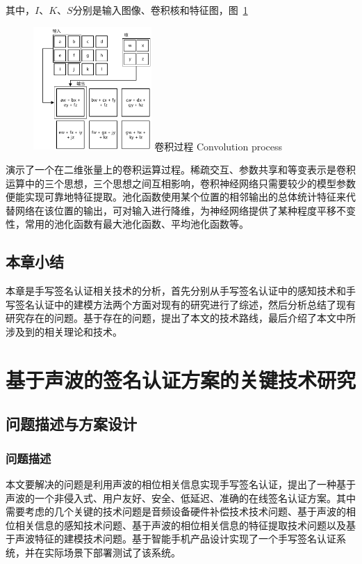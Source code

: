 其中，$I$、$K$、$S$分别是输入图像、卷积核和特征图，图~\ref{fig:convolution-process}
\begin{figure}[!htp]
  \centering
  \includegraphics[width=0.4\textwidth]{figure/convolution-process.pdf}
  \bicaption
    {卷积过程}
    {Convolution process}
  \label{fig:convolution-process}
\end{figure}
演示了一个在二维张量上的卷积运算过程。稀疏交互、参数共享和等变表示是卷积运算中的三个思想，三个思想之间互相影响，卷积神经网络只需要较少的模型参数便能实现可靠地特征提取。池化函数使用某个位置的相邻输出的总体统计特征来代替网络在该位置的输出，可对输入进行降维，为神经网络提供了某种程度平移不变性，常用的池化函数有最大池化函数、平均池化函数等。


\section{本章小结}
本章是手写签名认证相关技术的分析，首先分别从手写签名认证中的感知技术和手写签名认证中的建模方法两个方面对现有的研究进行了综述，然后分析总结了现有研究存在的问题。基于存在的问题，提出了本文的技术路线，最后介绍了本文中所涉及到的相关理论和技术。

\chapter{基于声波的签名认证方案的关键技术研究}
\section{问题描述与方案设计}
\subsection{问题描述}
本文要解决的问题是利用声波的相位相关信息实现手写签名认证，提出了一种基于声波的一个非侵入式、用户友好、安全、低延迟、准确的在线签名认证方案。其中需要考虑的几个关键的技术问题是音频设备硬件补偿技术技术问题、基于声波的相位相关信息的感知技术问题、基于声波的相位相关信息的特征提取技术问题以及基于声波特征的建模技术问题。基于智能手机产品设计实现了一个手写签名认证系统，并在实际场景下部署测试了该系统。

